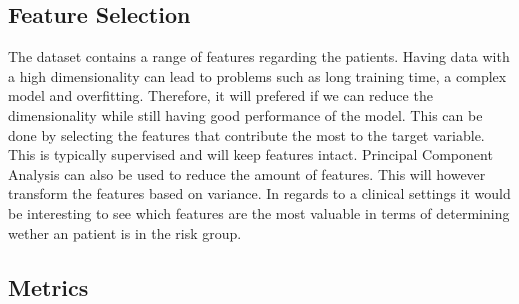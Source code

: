 \subsection*{Feature Selection}
The dataset contains a range of features regarding the patients. Having data with a high dimensionality can lead to problems such as long training time, a complex model and overfitting. Therefore, it will prefered if we can reduce the dimensionality while still having good performance of the model. This can be done by selecting the features that contribute the most to the target variable. This is typically supervised and will keep features intact. Principal Component Analysis can also be used to reduce the amount of features. This will however transform the features based on variance. In regards to a clinical settings it would be interesting to see which features are the most valuable in terms of determining wether an patient is in the risk group.

\subsection*{Metrics}